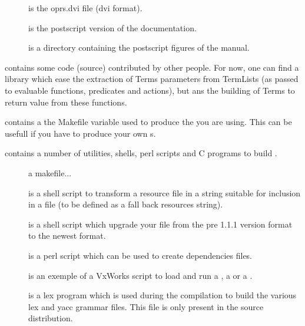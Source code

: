 \begin{description}
\begin{description}
\item [] is the oprs.dvi file (dvi format).

\item [] is the postscript version of the documentation.

\item [] is a directory containing the postscript figures of the
manual.

\end{description}

\item [\file{contrib}] contains some code (source) contributed by other people.
For now, one can find a library which ease the extraction of Terms parameters
from TermLists (as passed to evaluable functions, predicates and actions), but
ans the building of Terms to return value from these functions.

\item [\file{site.make}] contains a the Makefile variable used to produce the
\COPRSDE{} you are using. This can be usefull if you have to produce your own
\PK{}s.

\item [\file{util}] contains a number of utilities, shells, perl scripts and C
programs to build \COPRS{}.

\begin{description}

\item [] a makefile...

\item [] is a shell script to transform a  resource file
in a string suitable for inclusion in a  file (to be defined as a
fall back resources string).

\item [] is a shell script which upgrade your 
file from the pre 1.1.1 version format to the newest format.

\item [] is a perl script which can be used to create dependencies
files.

\item [] is an exemple of a VxWorks script to load and run a
\CPK{}, a \MPA{} or a \MPK{}.

\item [] is a lex program which is used during the \COPRS{}
compilation to build the various lex and yacc grammar files. This file is only
present in the source distribution.


\end{description}
\end{description}

